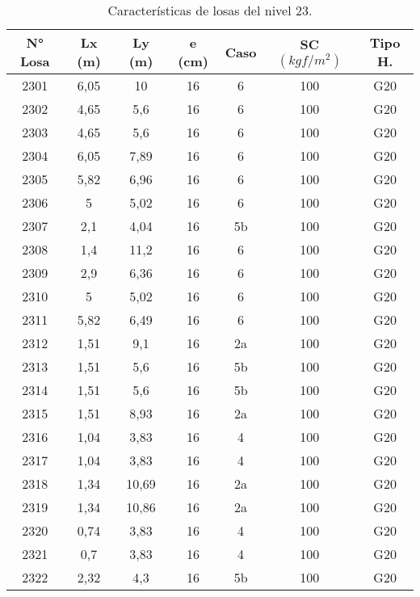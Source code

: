 \begin{table}[H]
  \centering
  \caption{Características de losas del nivel 23.}
  \begin{tabular}{ccccccc}
    \hline
    \textbf{N° Losa} &      \textbf{Lx (m)} &      \textbf{Ly (m)} &      \textbf{e (cm)} &      \textbf{Caso} &      \textbf{SC $(kgf/m^2)$} &      \textbf{Tipo H.}      \bigstrut\\
    \hline
    2301 &      6,05 &      10 &      16 &      6 &      100 &      G20      \bigstrut[t]\\
    2302 &      4,65 &      5,6 &      16 &      6 &      100 &      G20      \\
    2303 &      4,65 &      5,6 &      16 &      6 &      100 &      G20      \\
    2304 &      6,05 &      7,89 &      16 &      6 &      100 &      G20      \\
    2305 &      5,82 &      6,96 &      16 &      6 &      100 &      G20      \\
    2306 &      5 &      5,02 &      16 &      6 &      100 &      G20      \\
    2307 &      2,1 &      4,04 &      16 &      5b &      100 &      G20      \\
    2308 &      1,4 &      11,2 &      16 &      6 &      100 &      G20      \\
    2309 &      2,9 &      6,36 &      16 &      6 &      100 &      G20      \\
    2310 &      5 &      5,02 &      16 &      6 &      100 &      G20      \\
    2311 &      5,82 &      6,49 &      16 &      6 &      100 &      G20      \\
    2312 &      1,51 &      9,1 &      16 &      2a &      100 &      G20      \\
    2313 &      1,51 &      5,6 &      16 &      5b &      100 &      G20      \\
    2314 &      1,51 &      5,6 &      16 &      5b &      100 &      G20      \\
    2315 &      1,51 &      8,93 &      16 &      2a &      100 &      G20      \\
    2316 &      1,04 &      3,83 &      16 &      4 &      100 &      G20      \\
    2317 &      1,04 &      3,83 &      16 &      4 &      100 &      G20      \\
    2318 &      1,34 &      10,69 &      16 &      2a &      100 &      G20      \\
    2319 &      1,34 &      10,86 &      16 &      2a &      100 &      G20      \\
    2320 &      0,74 &      3,83 &      16 &      4 &      100 &      G20      \\
    2321 &      0,7 &      3,83 &      16 &      4 &      100 &      G20      \\
    2322 &      2,32 &      4,3 &      16 &      5b &      100 &      G20      \bigstrut[b]\\
    \hline
  \end{tabular}
  \label{losas23}
\end{table}

